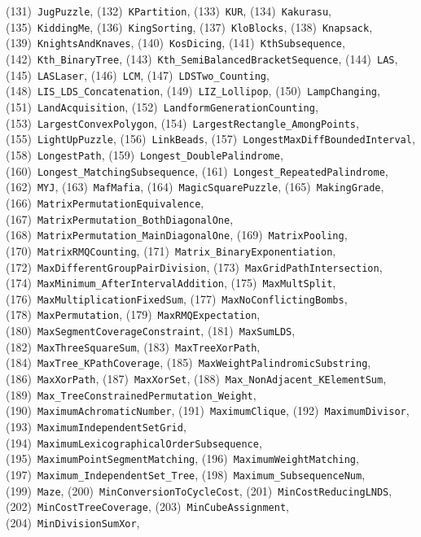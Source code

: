 \documentclass{article}
\theoremstyle{plain}
\theoremstyle{definition}
\theoremstyle{remark}
\begin{document}
\begin{flushleft}
(131)~\texttt{JugPuzzle},
(132)~\texttt{KPartition},
(133)~\texttt{KUR},
(134)~\texttt{Kakurasu},
(135)~\texttt{KiddingMe},
(136)~\texttt{KingSorting},
(137)~\texttt{KloBlocks},
(138)~\texttt{Knapsack},
(139)~\texttt{KnightsAndKnaves},
(140)~\texttt{KosDicing},
(141)~\texttt{KthSubsequence},
(142)~\texttt{Kth\_BinaryTree},
(143)~\texttt{Kth\_SemiBalancedBracketSequence},
(144)~\texttt{LAS},
(145)~\texttt{LASLaser},
(146)~\texttt{LCM},
(147)~\texttt{LDSTwo\_Counting},
(148)~\texttt{LIS\_LDS\_Concatenation},
(149)~\texttt{LIZ\_Lollipop},
(150)~\texttt{LampChanging},
(151)~\texttt{LandAcquisition},
(152)~\texttt{LandformGenerationCounting},
(153)~\texttt{LargestConvexPolygon},
(154)~\texttt{LargestRectangle\_AmongPoints},
(155)~\texttt{LightUpPuzzle},
(156)~\texttt{LinkBeads},
(157)~\texttt{LongestMaxDiffBoundedInterval},
(158)~\texttt{LongestPath},
(159)~\texttt{Longest\_DoublePalindrome},
(160)~\texttt{Longest\_MatchingSubsequence},
(161)~\texttt{Longest\_RepeatedPalindrome},
(162)~\texttt{MYJ},
(163)~\texttt{MafMafia},
(164)~\texttt{MagicSquarePuzzle},
(165)~\texttt{MakingGrade},
(166)~\texttt{MatrixPermutationEquivalence},
(167)~\texttt{MatrixPermutation\_BothDiagonalOne},
(168)~\texttt{MatrixPermutation\_MainDiagonalOne},
(169)~\texttt{MatrixPooling},
(170)~\texttt{MatrixRMQCounting},
(171)~\texttt{Matrix\_BinaryExponentiation},
(172)~\texttt{MaxDifferentGroupPairDivision},
(173)~\texttt{MaxGridPathIntersection},
(174)~\texttt{MaxMinimum\_AfterIntervalAddition},
(175)~\texttt{MaxMultSplit},
(176)~\texttt{MaxMultiplicationFixedSum},
(177)~\texttt{MaxNoConflictingBombs},
(178)~\texttt{MaxPermutation},
(179)~\texttt{MaxRMQExpectation},
(180)~\texttt{MaxSegmentCoverageConstraint},
(181)~\texttt{MaxSumLDS},
(182)~\texttt{MaxThreeSquareSum},
(183)~\texttt{MaxTreeXorPath},
(184)~\texttt{MaxTree\_KPathCoverage},
(185)~\texttt{MaxWeightPalindromicSubstring},
(186)~\texttt{MaxXorPath},
(187)~\texttt{MaxXorSet},
(188)~\texttt{Max\_NonAdjacent\_KElementSum},
(189)~\texttt{Max\_TreeConstrainedPermutation\_Weight},
(190)~\texttt{MaximumAchromaticNumber},
(191)~\texttt{MaximumClique},
(192)~\texttt{MaximumDivisor},
(193)~\texttt{MaximumIndependentSetGrid},
(194)~\texttt{MaximumLexicographicalOrderSubsequence},
(195)~\texttt{MaximumPointSegmentMatching},
(196)~\texttt{MaximumWeightMatching},
(197)~\texttt{Maximum\_IndependentSet\_Tree},
(198)~\texttt{Maximum\_SubsequenceNum},
(199)~\texttt{Maze},
(200)~\texttt{MinConversionToCycleCost},
(201)~\texttt{MinCostReducingLNDS},
(202)~\texttt{MinCostTreeCoverage},
(203)~\texttt{MinCubeAssignment},
(204)~\texttt{MinDivisionSumXor},

\end{flushleft}
\end{document}
